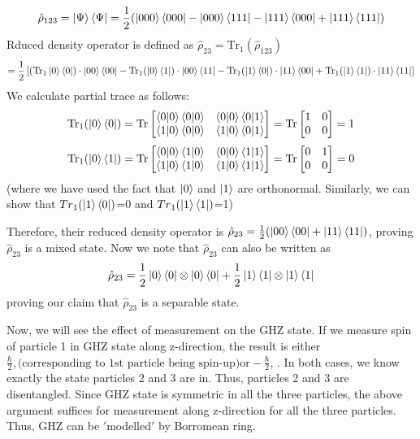 \documentclass{article}
\begin{document}
\[
\hat{\rho}_{123} = \ket{\Psi}\bra{\Psi}
 = \frac{1}{2} (\ket{000}\bra{000} - \ket{000}\bra{111} - \ket{111}\bra{000} + \ket{111}\bra{111})
\]
Rduced density operator is defined as $\hat{\rho}_{23} = \mathrm{Tr}_1(\hat{\rho}_{123})$
\[
= \frac{1}{2} \left[(\mathrm{Tr}_1\ket{0}\bra{0})\cdot\ket{00}\bra{00} - \mathrm{Tr}_1(\ket{0}\bra{1})\cdot\ket{00}\bra{11} - \mathrm{Tr}_1(\ket{1}\bra{0})\cdot\ket{11}\bra{00} + \mathrm{Tr}_1(\ket{1}\bra{1})\cdot\ket{11}\bra{11}\right]
\]
We calculate partial trace as follows:
\[
\text{Tr}_1(\ket{0}\bra{0}) = \text{Tr} \left[
\begin{matrix}
\braket{0|0} \braket{0|0} & \braket{0|0}\braket{0|1} \\
\braket{1|0} \braket{0|0} & \braket{1|0}\braket{0|1}
\end{matrix}
\right]
= \text{Tr} \left[
\begin{matrix}
1 & 0 \\
0 & 0
\end{matrix}
\right] = 1
\]
\[
\text{Tr}_1(\ket{0}\bra{1}) = \text{Tr} \left[
\begin{matrix}
\braket{0|0} \braket{1|0} & \braket{0|0}\braket{1|1} \\
\braket{1|0} \braket{1|0} & \braket{1|0}\braket{1|1}
\end{matrix}
\right]
= \text{Tr} \left[
\begin{matrix}
0 & 1 \\
0 & 0
\end{matrix}
\right] = 0
\]
(where we have used the fact that  $\ket{0}$ and $\ket{1}$ are orthonormal. Similarly, we can show that ${Tr}_1(\ket{1}\bra{0})$=0 and  ${Tr}_1(\ket{1}\bra{1})$=1)


Therefore, their reduced density operator is $
\hat{\rho}_{23} = \frac{1}{2} (\ket{00}\bra{00} + \ket{11}\bra{11})
$, proving $\hat{\rho}_{23}$ is a mixed state. Now we note that $\hat{\rho}_{23}$ can also be written as 
\[
\hat{\rho}_{23} = \frac{1}{2} \ket{0}\bra{0} \otimes \ket{0}\bra{0} + \frac{1}{2} \ket{1}\bra{1} \otimes \ket{1}\bra{1}
\]
proving our claim that $\hat{\rho}_{23}$ is a separable state. 

\bigskip
Now, we will see the effect of measurement on the GHZ state. If we measure spin of particle 1 in GHZ state along z-direction, the result is either 
$\frac{\hbar}{2}, \text{(corresponding to 1st particle being spin-up)} \text{or} -\frac{\hbar}{2}$, . In both cases, we know exactly the state particles 2 and 3 are in. Thus, particles 2 and 3 are disentangled. Since GHZ state is symmetric in all the three particles, the above argument suffices for measurement along z-direction for all the three particles. Thus, GHZ can be $'$modelled$'$ by Borromean ring. 
\end{document}
